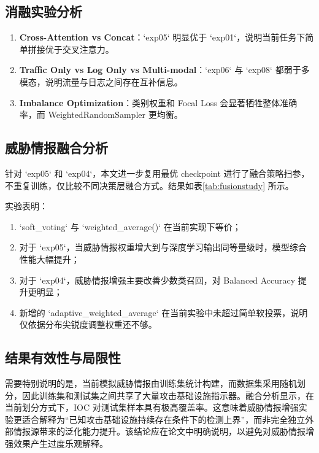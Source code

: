 \documentclass[UTF8,a4paper,12pt]{ctexart}
\begin{document}


\subsection{消融实验分析}
\begin{enumerate}[leftmargin=2em]
    \item \textbf{Cross-Attention vs Concat}：`exp05` 明显优于 `exp01`，说明当前任务下简单拼接优于交叉注意力。
    \item \textbf{Traffic Only vs Log Only vs Multi-modal}：`exp06` 与 `exp08` 都弱于多模态，说明流量与日志之间存在互补信息。
    \item \textbf{Imbalance Optimization}：类别权重和 Focal Loss 会显著牺牲整体准确率，而 WeightedRandomSampler 更均衡。
\end{enumerate}

\subsection{威胁情报融合分析}
针对 `exp05` 和 `exp04`，本文进一步复用最优 checkpoint 进行了融合策略扫参，不重复训练，仅比较不同决策层融合方式。结果如表\ref{tab:fusionstudy} 所示。



实验表明：
\begin{enumerate}[leftmargin=2em]
    \item `soft_voting` 与 `weighted\_average()` 在当前实现下等价；
    \item 对于 `exp05`，当威胁情报权重增大到与深度学习输出同等量级时，模型综合性能大幅提升；
    \item 对于 `exp04`，威胁情报增强主要改善少数类召回，对 Balanced Accuracy 提升更明显；
    \item 新增的 `adaptive\_weighted\_average` 在当前实验中未超过简单软投票，说明仅依据分布尖锐度调整权重还不够。
\end{enumerate}

\subsection{结果有效性与局限性}
需要特别说明的是，当前模拟威胁情报由训练集统计构建，而数据集采用随机划分，因此训练集和测试集之间共享了大量攻击基础设施指示器。融合分析显示，在当前划分方式下，IOC 对测试集样本具有极高覆盖率。这意味着威胁情报增强实验更适合解释为“已知攻击基础设施持续存在条件下的检测上界”，而非完全独立外部情报源带来的泛化能力提升。该结论应在论文中明确说明，以避免对威胁情报增强效果产生过度乐观解释。
\end{document}

